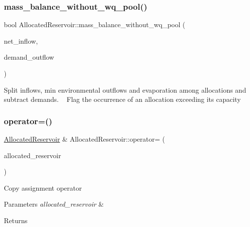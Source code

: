 \subsubsection{\texorpdfstring{mass\+\_\+balance\+\_\+without\+\_\+wq\+\_\+pool()}{mass\_balance\_without\_wq\_pool()}}
{\footnotesize\ttfamily bool Allocated\+Reservoir\+::mass\+\_\+balance\+\_\+without\+\_\+wq\+\_\+pool (\begin{DoxyParamCaption}\item[{double}]{net\+\_\+inflow,  }\item[{vector$<$ double $>$ \&}]{demand\+\_\+outflow }\end{DoxyParamCaption})}

Split inflows, min environmental outflows and evaporation among allocations and subtract demands. ~\newline
 Flag the occurrence of an allocation exceeding its capacity \mbox{\label{classAllocatedReservoir_a83551e53169014906ce7380005efb4f8_a83551e53169014906ce7380005efb4f8}} 
\subsubsection{\texorpdfstring{operator=()}{operator=()}}
{\footnotesize\ttfamily \mbox{\hyperlink{classAllocatedReservoir}{Allocated\+Reservoir}} \& Allocated\+Reservoir\+::operator= (\begin{DoxyParamCaption}\item[{const \mbox{\hyperlink{classAllocatedReservoir}{Allocated\+Reservoir}} \&}]{allocated\+\_\+reservoir }\end{DoxyParamCaption})}

Copy assignment operator 
\begin{DoxyParams}{Parameters}
{\em allocated\+\_\+reservoir} & \\
\hline
\end{DoxyParams}
\begin{DoxyReturn}{Returns}

\end{DoxyReturn}
\mbox{\label{classAllocatedReservoir_a3a9b7ce2e1d42cc373095cfd40ef2ae2_a3a9b7ce2e1d42cc373095cfd40ef2ae2}} 
